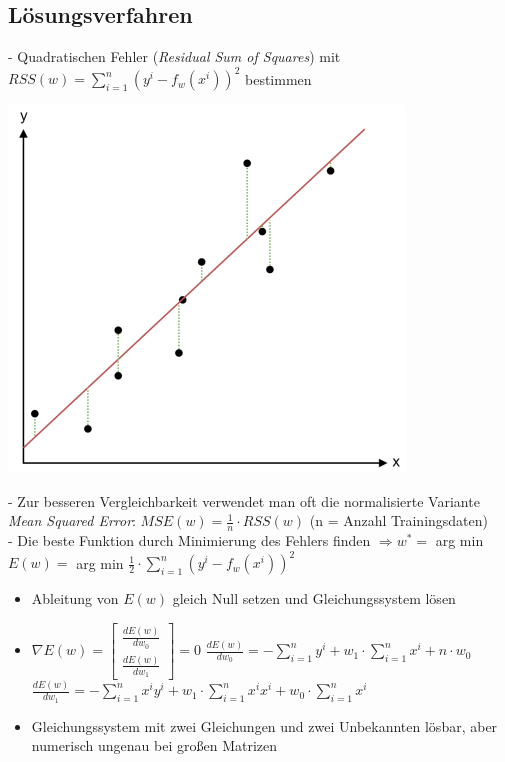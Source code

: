 \documentclass{report}
\begin{document}
\subsection{Lösungsverfahren}
- Quadratischen Fehler (\textit{Residual Sum of Squares}) mit\\
$RSS(w) = \sum_{i=1}^n(y^i - f_w(x^i))^2$ bestimmen
\begin{center}
  \includegraphics[scale=0.35]{ml02_2}
\end{center}
- Zur besseren Vergleichbarkeit verwendet man oft die normalisierte Variante\\
\textit{Mean Squared Error}: $MSE(w) = \frac{1}{n}\cdot RSS(w)$ (n = Anzahl Trainingsdaten)\\
- Die beste Funktion durch Minimierung des Fehlers finden
$\Rightarrow w^* =$ arg min $E(w) =$ arg min $\frac{1}{2}\cdot \sum_{i=1}^n(y^i - f_w(x^i))^2$\\
\vspace*{-1.25em}
\begin{itemize}
  \item Ableitung von $E(w)$ gleich Null setzen und Gleichungssystem lösen
  \item $\nabla E(w) = \begin{bmatrix}\frac{dE(w)}{dw_0}\\\frac{dE(w)}{dw_1}\end{bmatrix} = 0$
  \subitem $\frac{dE(w)}{dw_0} = -\sum_{i=1}^ny^i + w_1\cdot \sum_{i=1}^nx^i + n\cdot w_0$
  \subitem $\frac{dE(w)}{dw_1} = -\sum_{i=1}^nx^iy^i + w_1\cdot \sum_{i=1}^nx^ix^i + w_0\cdot \sum_{i=1}^nx^i$
  \item Gleichungssystem mit zwei Gleichungen und zwei Unbekannten lösbar, aber numerisch ungenau bei großen Matrizen 
\end{itemize}
\end{document}
